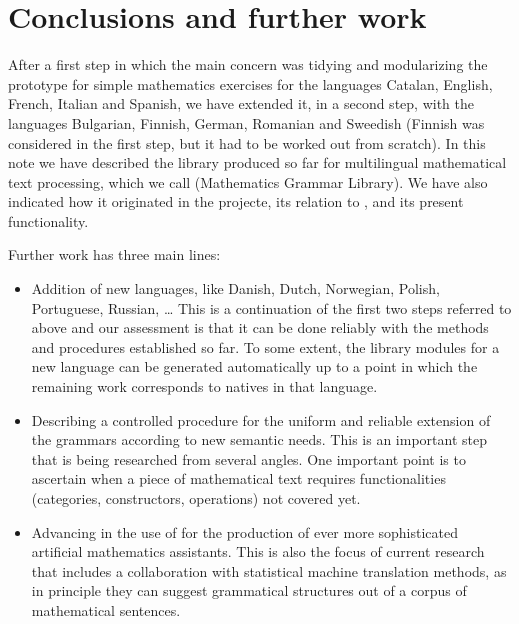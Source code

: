 \documentclass[submission,copyright,creativecommons]{eptcs}
\begin{document}


\section{Conclusions and further work}

After a first step in which the main concern was tidying and modularizing
the \webalt{} prototype for simple mathematics exercises for the languages
Catalan,
English,
French,
Italian and
Spanish,
we have extended it, in a second step, with the languages
Bulgarian, Finnish,
German, Romanian and Sweedish
(Finnish was considered in the first step, but it had to be worked out from
scratch).
In this note we have described the \GF{} library produced so far for
multilingual mathematical text processing, which we call
\MGL{} (Mathematics Grammar Library). We have also indicated how it
originated in the \webalt{} projecte, its relation to \GF{}, and its
present functionality.

Further work has three main lines:
\begin{itemize}
\item
Addition of new languages,
like Danish, Dutch, Norwegian, Polish, Portuguese, Russian, \ldots
This is a continuation of the first two steps referred to above and
our assessment is that it can be done reliably with the methods and
procedures established so far. To some extent, the library modules for a
new language can be generated automatically up to a point in which the
remaining work corresponds to natives in that language.
\item
Describing a controlled procedure for the uniform and reliable extension
of the grammars according to new semantic needs. This is an important step
that is being researched from several angles. One important point is to
ascertain when a piece of mathematical text requires functionalities
(categories, constructors, operations) not covered yet.
\item
Advancing in the use of \MGL{} for the production of ever more
sophisticated artificial mathematics assistants. This is also the focus of
current research that includes a collaboration with statistical machine
translation methods, as in principle they can suggest grammatical structures
out of a corpus of mathematical sentences.
\end{itemize}
\end{document}

